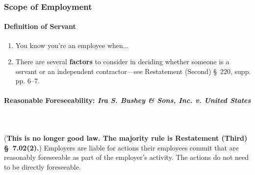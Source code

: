 \subsubsection{Scope of Employment}

\paragraph{Definition of Servant}

\begin{enumerate}
    \item You know you're an employee when...
    \item There are several \textbf{factors} to consider in deciding whether 
    someone is a servant or an independent contractor---see Restatement 
    (Second) \S\ 220, supp. pp. 6--7.
\end{enumerate}

\paragraph{Reasonable Foreseeability: \emph{Ira S. Bushey \& Sons, Inc. v. 
United States}}
~\\\\
(\textbf{This is no longer good law. The majority rule is Restatement (Third) 
\S\ 7.02(2).}) Employers are liable for actions their employees commit that 
are reasonably foreseeable as part of the employer's activity. The actions do 
not need to be directly foreseeable.

